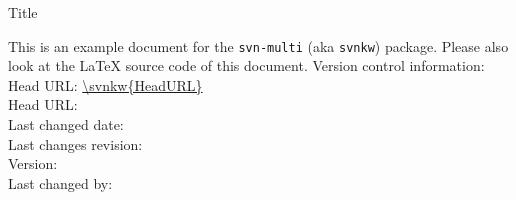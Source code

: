 \documentclass[12pt]{report}
\begin{document}
\begin{titlepage}
 \vspace{8ex}
 {\huge Title\par}
 \vspace{2ex}
 {\large \noindent This is an example document for the \texttt{svn-multi} (aka
 \texttt{svnkw}) package. Please also look at the LaTeX source code of this
 document.}
 \vfill
 \flushleft\sffamily
 Version control information:\\
 Head URL: \url{\svnkw{HeadURL}}\\
 Head URL: \\
 Last changed date: \svndate\\
 Last changes revision: \svnrev\\
 Version: \svnFullRevision*{\svnrev}\\
 Last changed by: \svnFullAuthor*{\svnauthor}\\
\end{titlepage}

\tableofcontents


%
%
\end{document}
